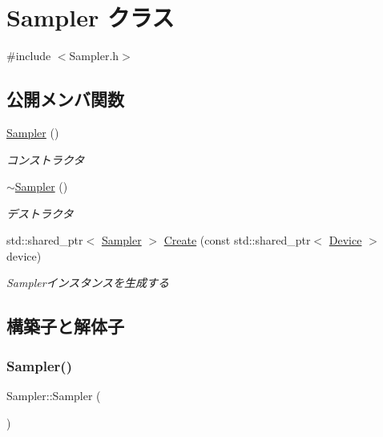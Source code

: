 \hypertarget{class_sampler}{}\section{Sampler クラス}
\label{class_sampler}


{\ttfamily \#include $<$Sampler.\+h$>$}

\subsection*{公開メンバ関数}
\begin{DoxyCompactItemize}
\item 
\mbox{\hyperlink{class_sampler_a9682037ac10546714cfde073143cb0be}{Sampler}} ()
\begin{DoxyCompactList}\small\item\em コンストラクタ \end{DoxyCompactList}\item 
\mbox{\hyperlink{class_sampler_afbbbd238b78dd3024686c852b69fa64e}{$\sim$\+Sampler}} ()
\begin{DoxyCompactList}\small\item\em デストラクタ \end{DoxyCompactList}\item 
std\+::shared\+\_\+ptr$<$ \mbox{\hyperlink{class_sampler}{Sampler}} $>$ \mbox{\hyperlink{class_sampler_a24b78ac0627c5feb7e12c860e4bacc87}{Create}} (const std\+::shared\+\_\+ptr$<$ \mbox{\hyperlink{class_device}{Device}} $>$ device)
\begin{DoxyCompactList}\small\item\em Samplerインスタンスを生成する \end{DoxyCompactList}\end{DoxyCompactItemize}


\subsection{構築子と解体子}
\mbox{\label{class_sampler_a9682037ac10546714cfde073143cb0be}} 
\subsubsection{\texorpdfstring{Sampler()}{Sampler()}}
{\footnotesize\ttfamily Sampler\+::\+Sampler (\begin{DoxyParamCaption}{ }\end{DoxyParamCaption})}



